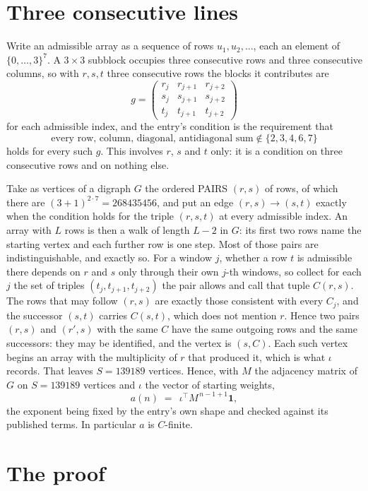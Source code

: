 \documentclass[11pt,a4paper]{article}
\theoremstyle{plain}
\theoremstyle{definition}
\begin{document}
\section{Three consecutive lines}

Write an admissible array as a sequence of rows $u_1,u_2,\dots$, each an element of
$\{0,\dots,3\}^{7}$. A $3\times3$ subblock occupies three consecutive rows and
three consecutive columns, so with $r,s,t$ three consecutive rows the blocks it
contributes are
\[
g=\begin{pmatrix}r_j&r_{j+1}&r_{j+2}\\ s_j&s_{j+1}&s_{j+2}\\ t_j&t_{j+1}&t_{j+2}\end{pmatrix}
\]
for each admissible index, and the entry's condition is the requirement that
\[
\text{every row, column, diagonal, antidiagonal sum} \notin \{2,3,4,6,7\}
\]
holds for every such $g$. This involves $r$, $s$ and $t$ only: it is a condition on
three consecutive rows and on nothing else.

Take as vertices of a digraph $G$ the ordered PAIRS $(r,s)$ of rows, of which there are
$(3+1)^{2\cdot7}=268435456$, and put an edge $(r,s)\to(s,t)$ exactly when the condition
holds for the triple $(r,s,t)$ at every admissible index. An array with $L$ rows is then a
walk of length $L-2$ in $G$: its first two rows name the starting vertex and each further
row is one step. Most of those pairs are indistinguishable, and exactly so. For a window $j$, whether a row $t$ is admissible there depends on $r$ and $s$ only through their own $j$-th windows, so collect for each $j$ the set of triples $(t_j,t_{j+1},t_{j+2})$ the pair allows and call that tuple $C(r,s)$. The rows that may follow $(r,s)$ are exactly those consistent with every $C_j$, and the successor $(s,t)$ carries $C(s,t)$, which does not mention $r$. Hence two pairs $(r,s)$ and $(r',s)$ with the same $C$ have the same outgoing rows and the same successors: they may be identified, and the vertex is $(s,C)$. Each such vertex begins an array with the multiplicity of $r$ that produced it, which is what $\iota$ records. That leaves $S=139189$ vertices. Hence, with $M$ the adjacency matrix of $G$ on $S=139189$ vertices and
$\iota$ the vector of starting weights,
\[
a(n)\;=\;\,\iota^{\!\top}M^{\,n-1+1}\mathbf{1},
\]
the exponent being fixed by the entry's own shape and checked against its published terms.
In particular $a$ is $C$-finite.

\section{The proof}
\end{document}
